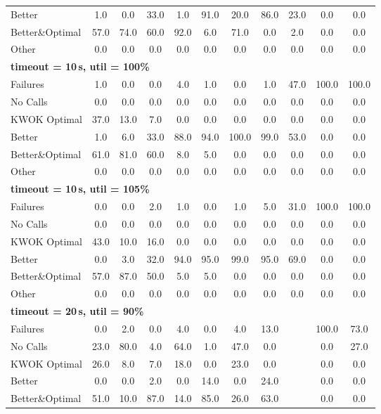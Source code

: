 \begin{tabular}{l cccccccccc}
Better & 1.0 & 0.0 & 33.0 & 1.0 & 91.0 & 20.0 & 86.0 & 23.0 & 0.0 & 0.0 \\
Better\&Optimal & 57.0 & 74.0 & 60.0 & 92.0 & 6.0 & 71.0 & 0.0 & 2.0 & 0.0 & 0.0 \\
Other & 0.0 & 0.0 & 0.0 & 0.0 & 0.0 & 0.0 & 0.0 & 0.0 & 0.0 & 0.0 \\
\midrule
\multicolumn{11}{l}{\textbf{timeout = 10\,s, util = 100\%}} \\
\midrule
Failures & 1.0 & 0.0 & 0.0 & 4.0 & 1.0 & 0.0 & 1.0 & 47.0 & 100.0 & 100.0 \\
No Calls & 0.0 & 0.0 & 0.0 & 0.0 & 0.0 & 0.0 & 0.0 & 0.0 & 0.0 & 0.0 \\
KWOK Optimal & 37.0 & 13.0 & 7.0 & 0.0 & 0.0 & 0.0 & 0.0 & 0.0 & 0.0 & 0.0 \\
Better & 1.0 & 6.0 & 33.0 & 88.0 & 94.0 & 100.0 & 99.0 & 53.0 & 0.0 & 0.0 \\
Better\&Optimal & 61.0 & 81.0 & 60.0 & 8.0 & 5.0 & 0.0 & 0.0 & 0.0 & 0.0 & 0.0 \\
Other & 0.0 & 0.0 & 0.0 & 0.0 & 0.0 & 0.0 & 0.0 & 0.0 & 0.0 & 0.0 \\
\midrule
\multicolumn{11}{l}{\textbf{timeout = 10\,s, util = 105\%}} \\
\midrule
Failures & 0.0 & 0.0 & 2.0 & 1.0 & 0.0 & 1.0 & 5.0 & 31.0 & 100.0 & 100.0 \\
No Calls & 0.0 & 0.0 & 0.0 & 0.0 & 0.0 & 0.0 & 0.0 & 0.0 & 0.0 & 0.0 \\
KWOK Optimal & 43.0 & 10.0 & 16.0 & 0.0 & 0.0 & 0.0 & 0.0 & 0.0 & 0.0 & 0.0 \\
Better & 0.0 & 3.0 & 32.0 & 94.0 & 95.0 & 99.0 & 95.0 & 69.0 & 0.0 & 0.0 \\
Better\&Optimal & 57.0 & 87.0 & 50.0 & 5.0 & 5.0 & 0.0 & 0.0 & 0.0 & 0.0 & 0.0 \\
Other & 0.0 & 0.0 & 0.0 & 0.0 & 0.0 & 0.0 & 0.0 & 0.0 & 0.0 & 0.0 \\
\midrule
\multicolumn{11}{l}{\textbf{timeout = 20\,s, util = 90\%}} \\
\midrule
Failures & 0.0 & 2.0 & 0.0 & 4.0 & 0.0 & 4.0 & 13.0 & \text{--} & 100.0 & 73.0 \\
No Calls & 23.0 & 80.0 & 4.0 & 64.0 & 1.0 & 47.0 & 0.0 & \text{--} & 0.0 & 27.0 \\
KWOK Optimal & 26.0 & 8.0 & 7.0 & 18.0 & 0.0 & 23.0 & 0.0 & \text{--} & 0.0 & 0.0 \\
Better & 0.0 & 0.0 & 2.0 & 0.0 & 14.0 & 0.0 & 24.0 & \text{--} & 0.0 & 0.0 \\
Better\&Optimal & 51.0 & 10.0 & 87.0 & 14.0 & 85.0 & 26.0 & 63.0 & \text{--} & 0.0 & 0.0 \\

\end{tabular}
